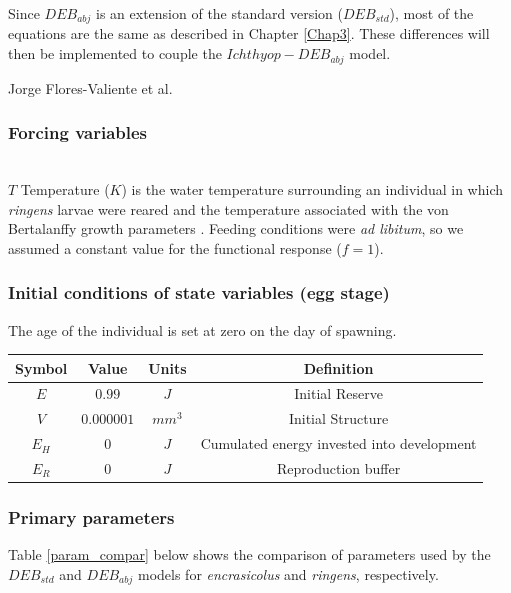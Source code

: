 Since $DEB_{abj}$ is an extension of the standard version ($DEB_{std}$), most of the equations are the same as described in Chapter \ref{Chap3}. These differences will then be implemented to couple the $Ichthyop-DEB_{abj}$ model.

Jorge Flores-Valiente et al.\\

\subsubsection{Forcing variables}\label{Chap4ForVar}
\hfill \\

$T$ Temperature ($K$) is the water temperature surrounding an individual in which \textit{\gls{ringens}} larvae were reared \citep{RiouOfel2021} and the temperature associated with the von Bertalanffy growth parameters \citep{PaloMuck1987}. Feeding conditions were \textit{ad libitum}, so we assumed a constant value for the functional response ($f = 1$).\\

\subsubsection{Initial conditions of state variables (egg stage)}\label{Chap4InitCond}

The age of the individual is set at zero on the day of spawning.\\

\begin{tabular}{|c|c|c|c|}
\hline 
Symbol  & Value      & Units  & Definition      \\ 
\hline 
$E$     & $0.99$     & $J$    & Initial Reserve \\ 
$V$     & $0.000001$ & $mm^3$ & Initial Structure\\
$E_{H}$ & $0$ 		  & $J$    & Cumulated energy invested into development\\
$E_{R}$ & $0$         & $J$   & Reproduction buffer\\
\hline 
\end{tabular}

\subsubsection{Primary parameters}\label{Chap4PriPar}
Table \ref{param_compar} below shows the comparison of parameters used by the $DEB_{std}$ and $DEB_{abj}$ models for \textit{\gls{encrasicolus}} and \textit{\gls{ringens}}, respectively.

